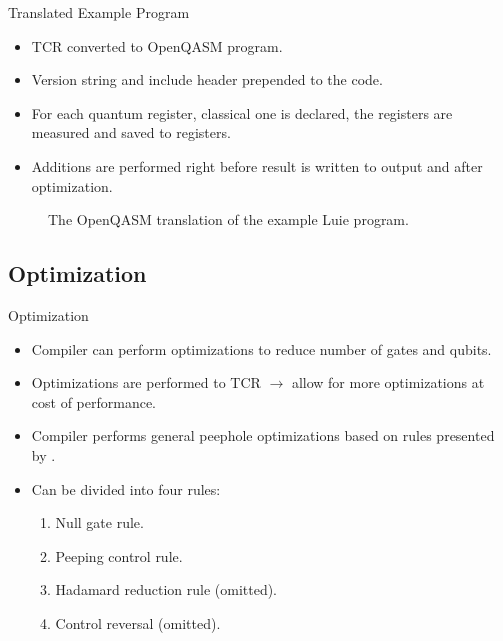 \begin{frame}{Translated Example Program}    
    \begin{minipage}{.45\textwidth}
        \begin{itemize}
            \item TCR converted to OpenQASM program.
            \item Version string and include header prepended to the code.
            \item For each quantum register, classical one is declared, the registers are measured and saved to registers. 
            \item Additions are performed right before result is written to output and after optimization.
        \end{itemize}
    \end{minipage}
    \hfill
    \begin{minipage}{.50\textwidth}
        \centering
        \vfill
        \begin{figure}
            \centering
            
            \caption{The OpenQASM translation of the example Luie program.}
        \end{figure}
        \vfill
    \end{minipage}
\end{frame}

\subsection{Optimization}
\begin{frame}{Optimization}
    \begin{itemize}
        \item Compiler can perform optimizations to reduce number of gates and qubits.
        \item Optimizations are performed to TCR $\to$ allow for more optimizations at cost of performance.
        \item Compiler performs general peephole optimizations based on rules presented by \cite{GaCh11}.
        \item Can be divided into four rules:
        \begin{enumerate}
            \item Null gate rule. 
            \item Peeping control rule.
            \item Hadamard reduction rule (omitted).
            \item Control reversal (omitted).
        \end{enumerate}
    \end{itemize}
\end{frame}


